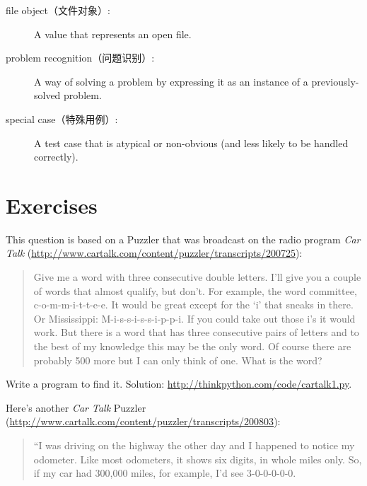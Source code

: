 \documentclass[10pt]{book}
\begin{document}
\begin{CJK}{UTF8}{gbsn}
\begin{description}

\item[file object（文件对象）:] A value that represents an open file.

\item[problem recognition（问题识别）:] A way of solving a problem by
expressing it as an instance of a previously-solved problem.

\item[special case（特殊用例）:] A test case that is atypical or non-obvious
(and less likely to be handled correctly).

\end{description}


\section{Exercises}

\begin{exercise}

This question is based on a Puzzler that was broadcast on the radio
program {\em Car Talk} 
(\url{http://www.cartalk.com/content/puzzler/transcripts/200725}):

\begin{quote}
Give me a word with three consecutive double letters. I'll give you a
couple of words that almost qualify, but don't. For example, the word
committee, c-o-m-m-i-t-t-e-e. It would be great except for the `i' that
sneaks in there. Or Mississippi: M-i-s-s-i-s-s-i-p-p-i. If you could
take out those i's it would work. But there is a word that has three
consecutive pairs of letters and to the best of my knowledge this may
be the only word. Of course there are probably 500 more but I can only
think of one. What is the word?
\end{quote}

Write a program to find it.  Solution: \url{http://thinkpython.com/code/cartalk1.py}.

\end{exercise}


\begin{exercise}
Here's another {\em Car Talk}
Puzzler (\url{http://www.cartalk.com/content/puzzler/transcripts/200803}):

\begin{quote}
``I was driving on the highway the other day and I happened to
notice my odometer. Like most odometers, it shows six digits,
in whole miles only. So, if my car had 300,000
miles, for example, I'd see 3-0-0-0-0-0.


\end{quote}
\end{exercise}
\end{CJK}
\end{document}

